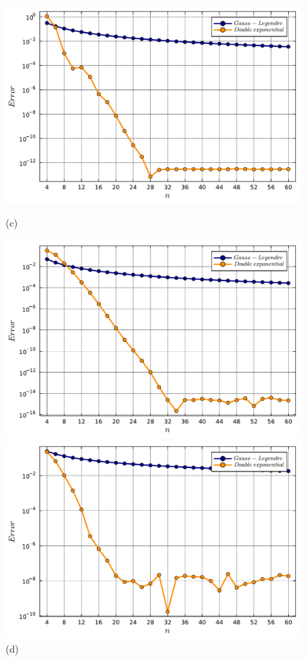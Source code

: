 \documentclass[letterpaper, 12pt]{article}
\begin{document}
\begin{figure}[!ht]
    \begin{minipage}[b]{0.47\textwidth}
        \includegraphics[width=\textwidth]{5433.pdf}
        \caption*{(c)}
    \end{minipage}
    \begin{minipage}[b]{0.47\textwidth}
        \includegraphics[width=\textwidth]{5434.pdf}
        \caption*{(d)}
    \end{minipage}
    \begin{minipage}[b]{0.47\textwidth}
        \includegraphics[width=\textwidth]{5435.pdf}

\end{minipage}
\end{figure}
\end{document}
